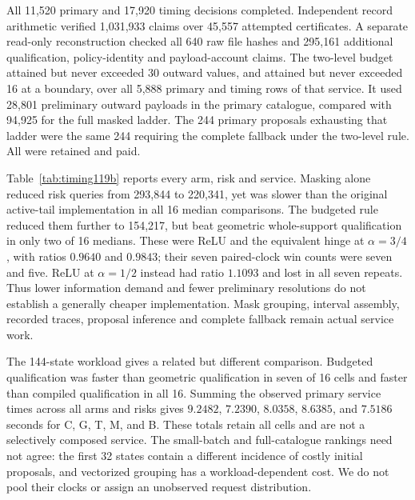 

All 11,520 primary and 17,920 timing decisions completed.  Independent
record arithmetic verified 1,031,933 claims over 45,557 attempted
certificates.  A separate read-only reconstruction checked all 640 raw
file hashes and 295,161 additional qualification, policy-identity and
payload-account claims.  The two-level budget attained but never exceeded
30 outward values, and attained but never exceeded 16 at a boundary,
over all 5,888 primary and timing rows of that service.  It used 28,801
preliminary outward payloads in the primary catalogue, compared with
94,925 for the full masked ladder.  The 244 primary proposals exhausting
that ladder were the same 244 requiring the complete fallback under the
two-level rule.  All were retained and paid.

Table~\ref{tab:timing119b} reports every arm, risk and service.  Masking
alone reduced risk queries from 293,844 to 220,341, yet was slower than
the original active-tail implementation in all 16 median comparisons.
The budgeted rule reduced them further to 154,217, but beat geometric
whole-support qualification in only two of 16 medians.  These were ReLU
and the equivalent hinge at $\alpha=3/4$, with ratios $0.9640$ and
$0.9843$; their seven paired-clock win counts were seven and five.
ReLU at $\alpha=1/2$ instead had ratio $1.1093$ and lost in all seven
repeats.  Thus lower information demand and fewer preliminary resolutions
do not establish a generally cheaper implementation.  Mask grouping,
interval assembly, recorded traces, proposal inference and complete
fallback remain actual service work.

The 144-state workload gives a related but different comparison.  Budgeted
qualification was faster than geometric qualification in seven of 16
cells and faster than compiled qualification in all 16.  Summing the
observed primary service times across all arms and risks gives $9.2482$,
$7.2390$, $8.0358$, $8.6385$, and $7.5186$ seconds for C, G, T, M, and B.
These totals retain all cells and are not a selectively composed service.
The small-batch and full-catalogue rankings need not agree: the first 32
states contain a different incidence of costly initial proposals, and
vectorized grouping has a workload-dependent cost.  We do not pool their
clocks or assign an unobserved request distribution.

